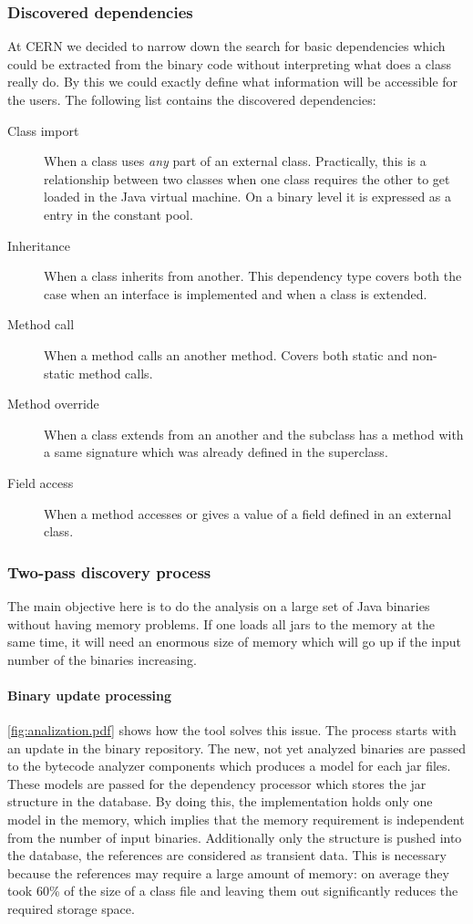 \subsubsection{Discovered dependencies}
At CERN we decided to narrow down the search for basic
dependencies which could be extracted from the binary code without interpreting
what does a class really do. By this we could exactly define what information
will be accessible for the users. The following list contains the discovered
dependencies:
\begin{description}
\item[Class import] When a class uses \emph{any} part of an external class. 
Practically, this is a relationship between two classes when one class requires
the other to get loaded in the Java virtual machine. On a binary level it is 
expressed as a  entry in the constant pool.  
\item[Inheritance] When a class inherits from another. This dependency type 
covers both the case when an interface is implemented and when a class is 
extended. 
\item[Method call] When a method calls an another method. Covers both static 
and non-static method calls.
\item[Method override] When a class extends from an another and the subclass 
has a method with a same signature which was already defined in the superclass.  
\item[Field access] When a method accesses or gives a value of a field defined 
in an external class.
\end{description}


\subsubsection{Two-pass discovery process}
The main objective here is to do the analysis on a large set of Java binaries
without having memory problems. If one loads all jars to the memory at the same
time, it will need an enormous size of memory which will go up if the input
number of the binaries increasing.


\paragraph{Binary update processing}
\autoref{fig:analization.pdf} shows how the tool solves this issue. The process
starts with an update in the binary repository. The new, not yet analyzed
binaries are passed to the bytecode analyzer components which produces a model
for each jar files. These models are passed for the dependency processor which
stores the jar structure in the database. By doing this, the implementation
holds only one model in the memory, which implies that the memory requirement is
independent from the number of input binaries. Additionally only the structure
is pushed into the database, the references are considered as transient data.
This is necessary because the references may require a large amount of memory:
on average they took 60\% of the size of a class file and leaving them out
significantly reduces the required storage space.

